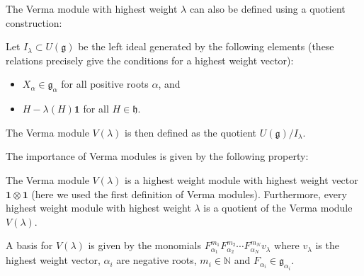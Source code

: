     The Verma module with highest weight $\lambda$ can also be defined using a quotient construction:
    \begin{adefinition}
        Let $I_\lambda\subset U(\mathfrak{g})$ be the left ideal generated by the following elements (these relations precisely give the conditions for a highest weight vector):
        \begin{itemize}
            \item $X_\alpha\in\mathfrak{g_\alpha}$ for all positive roots $\alpha$, and
            \item $H-\lambda(H)\mathbf{1}$ for all $H\in\mathfrak{h}$.
        \end{itemize}
        The Verma module $V(\lambda)$ is then defined as the quotient $U(\mathfrak{g})/I_\lambda$.
    \end{adefinition}

    The importance of Verma modules is given by the following property:
    \begin{property}
        The Verma module $V(\lambda)$ is a highest weight module with highest weight vector $\mathbf{1}\otimes\mathbf{1}$ (here we used the first definition of Verma modules). Furthermore, every highest weight module with highest weight $\lambda$ is a quotient of the Verma module $V(\lambda)$.
    \end{property}

    \begin{property}
         A basis for $V(\lambda)$ is given by the monomials $F_{\alpha_1}^{m_1}F_{\alpha_2}^{m_2}\cdots F_{\alpha_N}^{m_N}v_\lambda$ where $v_\lambda$ is the highest weight vector, $\alpha_i$ are negative roots, $m_i\in\mathbb{N}$ and $F_{\alpha_i}\in\mathfrak{g}_{\alpha_i}$.
    \end{property}

